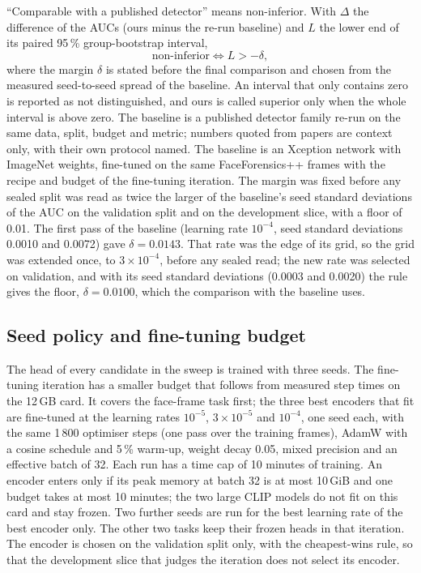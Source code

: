 \documentclass[conference,a4paper]{IEEEtran_nodash}
\begin{document}
``Comparable with a published detector'' means non-inferior. With $\Delta$ the
difference of the AUCs (ours minus the re-run baseline) and $L$ the lower end of
its paired 95\,\% group-bootstrap interval,
\begin{equation}
\text{non-inferior}\iff L>-\delta,
\end{equation}
where the margin $\delta$ is stated before the final comparison and chosen from
the measured seed-to-seed spread of the baseline. An interval that only contains
zero is reported as not distinguished, and ours is called superior only when
the whole interval is above zero. The baseline is a published detector family
re-run on the same data, split, budget and metric; numbers quoted from papers
are context only, with their own protocol named. The baseline is an Xception
network with ImageNet weights, fine-tuned on the same FaceForensics++ frames
with the recipe and budget of the fine-tuning iteration. The margin was fixed
before any sealed split was read as twice the larger of the baseline's seed
standard deviations of the AUC on the validation split and on the development
slice, with a floor of 0.01. The first pass of the baseline (learning rate
$10^{-4}$, seed standard deviations 0.0010 and 0.0072) gave $\delta=0.0143$.
That rate was the edge of its grid, so the grid was extended once, to
$3\times10^{-4}$, before any sealed read; the new rate was selected on
validation, and with its seed standard deviations (0.0003 and 0.0020) the rule
gives the floor, $\delta=0.0100$, which the comparison with the baseline uses. %

\subsection{Seed policy and fine-tuning budget}
The head of every candidate in the sweep is trained with three seeds. The
fine-tuning iteration has a smaller budget that follows from measured step times
on the 12\,GB card. It covers the face-frame task first; the three best
encoders that fit are fine-tuned at the learning rates $10^{-5}$,
$3\times10^{-5}$ and $10^{-4}$, one seed each, with the same 1\,800 optimiser
steps (one pass over the training frames), AdamW with a cosine schedule and
5\,\% warm-up, weight decay 0.05, mixed precision and an effective batch of 32.
Each run has a time cap of 10 minutes of training. An encoder enters only if its
peak memory at batch 32 is at most 10\,GiB and one budget takes at most 10
minutes; the two large CLIP models do not fit on this card and stay frozen. Two
further seeds are run for the best learning rate of the best encoder only. The
other two tasks keep their frozen heads in that iteration. The encoder is
chosen on the validation split only, with the cheapest-wins rule, so that the
development slice that judges the iteration does not select its encoder.
\end{document}
